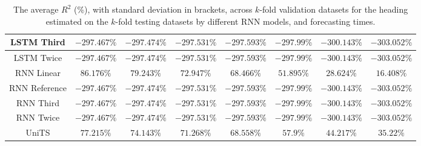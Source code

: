 \begin{table}[!ht]
{\begin{tabular}{|c|c|c|c|c|c|c|c|}
			LSTM Third & $-297.467\%$ & $-297.474\%$ & $-297.531\%$ & $-297.593\%$ & $-297.99\%$ & $-300.143\%$ & $-303.052\%$ \\ \hline
			LSTM Twice & $-297.467\%$ & $-297.474\%$ & $-297.531\%$ & $-297.593\%$ & $-297.99\%$ & $-300.143\%$ & $-303.052\%$ \\ \hline
			RNN Linear & $\mathbf{86.176\%}$ & $\mathbf{79.243\%}$ & $\mathbf{72.947\%}$ & $68.466\%$ & $51.895\%$ & $28.624\%$ & $16.408\%$ \\ \hline
			RNN Reference & $-297.467\%$ & $-297.474\%$ & $-297.531\%$ & $-297.593\%$ & $-297.99\%$ & $-300.143\%$ & $-303.052\%$ \\ \hline
			RNN Third & $-297.467\%$ & $-297.474\%$ & $-297.531\%$ & $-297.593\%$ & $-297.99\%$ & $-300.143\%$ & $-303.052\%$ \\ \hline
			RNN Twice & $-297.467\%$ & $-297.474\%$ & $-297.531\%$ & $-297.593\%$ & $-297.99\%$ & $-300.143\%$ & $-303.052\%$ \\ \hline
			UniTS & $77.215\%$ & $74.143\%$ & $71.268\%$ & $\mathbf{68.558\%}$ & $\mathbf{57.9\%}$ & $\mathbf{44.217\%}$ & $\mathbf{35.22\%}$ \\ \hline
		\end{tabular}
	}
	\caption{The average $R^{2}$ (\%), with standard deviation in brackets, across $k$-fold validation datasets for the heading estimated on the $k$-fold testing datasets by different RNN models, and forecasting times.}
	\label{tab:all_direction_R2}
\end{table}

